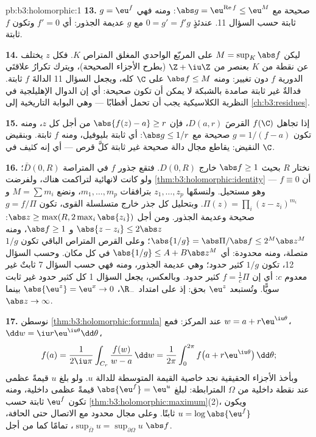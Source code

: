 \begin{solution}{pb:b3:holomorphic:1}
\textbf{13.} $g = \eu^f$ صحيحة مع $\abs g =
\eu^{\operatorname{Re}f} \leq \eu^M$: ومنه فهي ثابتة حسب
السؤال 11. عندئذٍ $0 = g' = f'g$ مع $g$ عديمة الجذور: أي
$f' = 0$ وتكون $f$ ثابتة.

\textbf{14.} ليكن $M = \sup_K\abs f$ على المربّع الواحدي المغلق المتراص
$K$. فكل $z$ يختلف عن نقطة من $K$ بعنصر من $\Z + \iu\Z$ (بطرح
الأجزاء الصحيحة)، ويترك تكرارُ علاقتَي الدورية $f$ دون تغيير:
ومنه $\abs f \leq M$ على $\C$ كله، ويجعل السؤال 11 الدالةَ $f$
ثابتة. فدالةٌ غير ثابتة صامدة بالشبكة لا يمكن أن تكون صحيحة:
أي إن الدوال الإهليلجية في النظرية الكلاسيكية يجب أن تحمل
أقطابًا --- وهي البوابة التاريخية إلى \cref{ch:b3:residues}.

\textbf{15.} إذا تجاهل $f(\C)$ القرصَ $D(a, r)$، فإن $\abs{f(z) - a} \geq r$ من
أجل كل $z$، ومنه تكون $g = 1/(f - a)$ صحيحة مع $\abs g \leq 1/r$: أي
ثابتة بليوفيل، ومنه $f$ ثابتة. وبنقيض النقيض: يقاطع مجال دالة
صحيحة غير ثابتة كلَّ قرص --- أي إنه كثيف في $\C$.

\textbf{16.} نختار $R$ بحيث $\abs f \geq 1$ خارج $D(0, R)$.
فتقع جذور $f$ في المتراصة $\bar D(0, R)$؛ ولو كانت لانهائية
لتراكمت هناك، ولفرضت \cref{thm:b3:holomorphic:identity} أن $f
\equiv 0$ --- وهو مستحيل.
ولنسمّها $z_1, \dots, z_p$ بترافقات $m_1, \dots, m_p$، ونضع $M = \sum m_i$
و $\Pi(z) = \prod_i(z - z_i)^{m_i}$. وبتحليل كل جذر خارج متسلسلة القوى، تكون $g = f/\Pi$
صحيحة وعديمة الجذور. ومن أجل $\abs z \geq \max(R, 2\max_i\abs{z_i})$: $\abs{z - z_i}
\leq 2\abs z$ و
$\abs f \geq 1$، ومنه $\abs{1/g} =
\abs\Pi/\abs f \leq 2^M\abs z^M$؛ وعلى القرص المتراص الباقي تكون
$1/g$ متصلة، ومنه محدودة: أي $\abs{1/g} \leq A +
B\abs z^M$ في كل مكان. وحسب السؤال
12، تكون $1/g$ كثير حدود؛ وهي عديمة الجذور، ومنه فهي حسب
السؤال 7 ثابتٌ غير معدوم $c$: أي إن $f = \frac1c\Pi$ كثير حدود.
وبالعكس، يجعل السؤال 1 كل كثير حدود غير ثابت سويًّا. وتُستبعد
$\eu^z$ بحق: إذ على امتداد $\R_-$، $\abs{\eu^z} = \eu^x \to 0$ بينما $\abs z \to \infty$.

\textbf{17.} نوسطن \cref{thm:b3:holomorphic:formula} عند المركز: فمع $w = a + r\eu^{\iu\theta}$، $\dd w = \iu
r\eu^{\iu\theta}\dd\theta$،
\[
f(a) = \frac1{2\iu\pi}\int_{C_r}\frac{f(w)}{w - a}\,\dd w
= \frac1{2\pi}\int_0^{2\pi}
f\bigl(a + r\eu^{\iu\theta}\bigr)\,\dd\theta ;
\]
وبأخذ الأجزاء الحقيقية نجد خاصية القيمة المتوسطة للدالة $u$.
ولو بلغ $u$ قيمةً عظمى عند نقطة داخلية من $\Omega$ المترابطة:
لبلغ $\abs{\eu^f} = \eu^u$ قيمةً عظمى داخلية، ومنه تكون $\eu^f$ ثابتة حسب
\cref{thm:b3:holomorphic:maximum}(2)، ويكون $u =
\log\abs{\eu^f}$ ثابتًا. وعلى مجال محدود مع
الاتصال حتى الحافة، $\sup_{\bar\Omega}u =
\sup_{\partial\Omega}u$، تمامًا كما من أجل $\abs f$.


\end{solution}
